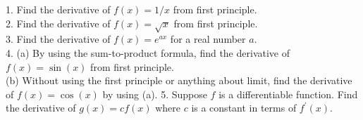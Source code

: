 1. Find the derivative of $f(x)=1/x$ from first principle.\\
2. Find the derivative of $f(x)=\sqrt x$ from first principle.\\
3. Find the derivative of $f(x)=e^{ax}$ for a real number $a$.\\
4. (a) By using the sum-to-product formula, find the derivative of $f(x)=\sin(x)$ from first principle.\\
(b) Without using the first principle or anything about limit, find the derivative of $f(x)=\cos(x)$ by using (a).
5. Suppose $f$ is a differentiable function. Find the derivative of $g(x)=cf(x)$ where $c$ is a constant in terms of $f^\prime(x)$.